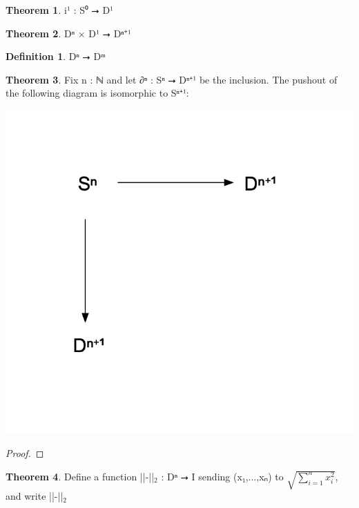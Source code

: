 \documentclass{book}
\theoremstyle{definition}
\newtheorem{definition}{Definition}
\newtheorem{theorem}{Theorem}
\begin{document}

\begin{theorem}
i¹ : S⁰ ⭢ D¹ 
\end{theorem}

\begin{theorem}
Dⁿ × D¹ ⭢ Dⁿ⁺¹
\end{theorem}

\begin{definition}
Dⁿ ⭢ Dᵐ
\end{definition}


\begin{theorem}
Fix n : ℕ and let ∂ⁿ : Sⁿ ⭢ Dⁿ⁺¹ be the inclusion. The pushout of the following diagram is isomorphic to Sⁿ⁺¹:
\begin{center}
\includegraphics[scale=0.5]{pushout.png}
\end{center}
\end{theorem}

\begin{proof}

\end{proof}


\begin{theorem}
Define a function ||-||${}_{2}$ : Dⁿ ⭢ I sending (x₁,...,xₙ) to $\sqrt{\sum_{i = 1}^n x_i^2}$, and write ||-||${}_{2}$
\end{theorem}
\end{document}
